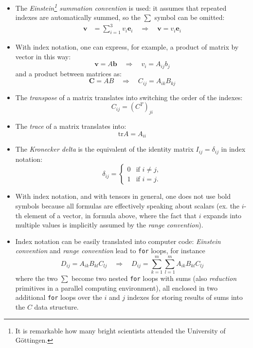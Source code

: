 \documentclass{digitaldynamics}
\def\vect#1{\bm{#1}}
\def\matr#1{{#1}}
\begin{document}
\begin{itemize}


	\item The \textit{Einstein\footnote{It is remarkable how many bright scientists attended the University of Göttingen.} summation convention} is used: it assumes that repeated indexes 
	are automatically summed, so the $\sum$ symbol can be omitted:
	\begin{align*}
  \vect{v} &= \sum_{i=1}^{3} v_i \vect{e}_i   \quad \Rightarrow \quad   \vect{v} =  v_i \vect{e}_i 
	\end{align*}
	
	\item With index notation,	one can express, for example, a product of matrix by vector in this way:
	\[
	\vect{v} = \matr{A} \vect{b}   \quad \Rightarrow \quad  v_i = A_{i j} b_j
	\]
	and a product between matrices as:
	\[
	\vect{C} = \matr{A} \matr{B}   \quad \Rightarrow \quad  C_{i j} = A_{i k} B_{k j} 
	\]
	
	\item The \textit{transpose} of a matrix translates into switching the order of the indexes:
	\[
	C_{i j} = (C^T)_{j i} 
	\]
	
	\item The \textit{trace} of a matrix translates into:
	\[
	\text{tr} A = A_{i i}
	\]
	
	\item The \textit{Kronecker delta} is the equivalent of the identity matrix $\matr{I}_{ij}=\delta_{ij}$ in index notation:
	\[
			\delta_{ij} = \begin{cases}
		0 &\text{if } i \neq j,   \\
		1 &\text{if } i=j.   \end{cases}
	\]
	
	\item With index notation, and with tensors in general, one does not use bold symbols because
	all formulas are effectively speaking about scalars (ex. the $i$-th element of a vector, in formula above, where the fact that $i$ expands into multiple values is implicitly assumed by the \textit{range convention}).
	
	\item Index notation can be easily translated into computer code: \textit{Einstein convention} and \textit{range convention} lead to \texttt{for} loops, for instance
	\[
	D_{i j} = A_{i k} B_{k l} C_{l j}  \quad \Rightarrow \quad  D_{i j} = \sum_{k=1}^{m} \sum_{l=1}^{m} A_{i k} B_{k l} C_{l j}
	\]
	where the two $\sum$ become two nested \texttt{for} loops with sums (also \textit{reduction} primitives in a parallel computing environment),
	all enclosed in two additional \texttt{for} loops over the $i$ and $j$ indexes for storing results of sums into the $C$ data structure.
	

\end{itemize}
\end{document}
